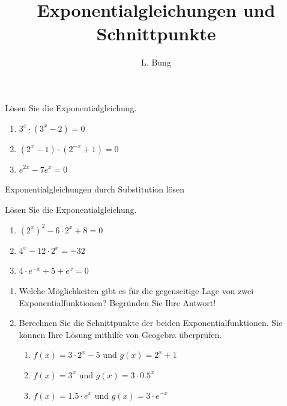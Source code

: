 \documentclass[11pt, a4paper, oneside]{article}
\begin{document}
	\author{L. Bung}
	\title{Exponentialgleichungen und Schnittpunkte}
	\subject{Mathematik}
	\maketitle
	
	
	Lösen Sie die Exponentialgleichung.
	
	\begin{enumerate}[label=\alph*)]
		\item $3^x \cdot \left(3^x - 2\right) = 0$
		\item $\left(2^x - 1\right) \cdot \left(2^{-x} + 1\right) = 0$
		\item $e^{2x} - 7e^x = 0$
	\end{enumerate}
	
	\checkered[16cm]
	
	\begin{hint}{Exponentialgleichungen durch Substitution lösen}
		\phantom{x}\vspace{5cm}
	\end{hint}
	
	
	Lösen Sie die Exponentialgleichung.
	
	\begin{enumerate}[label=\alph*)]
		\item $\left(2^x\right)^2 - 6 \cdot 2^x + 8 = 0$
		\item $4^x - 12 \cdot 2^x = -32$
		\item $4 \cdot e^{-x} + 5 + e^x = 0$
	\end{enumerate}
	
	\checkered[11cm]
	
	
	\begin{enumerate}[label=\alph*)]
		\item Welche Möglichkeiten gibt es für die gegenseitige Lage von zwei Exponentialfunktionen?
		Begründen Sie Ihre Antwort!
		
		\lines[2cm]
		
		\item Berechnen Sie die Schnittpunkte der beiden Exponentialfunktionen.
		Sie können Ihre Lösung mithilfe von Geogebra überprüfen.
		\begin{enumerate}[label=(\roman*)]
			\item $f(x) = 3 \cdot 2^x - 5$ und $g(x) = 2^x + 1$
			\item $f(x) = 3^x$ und $g(x) = 3 \cdot 0.5^x$
			\item $f(x) = 1.5 \cdot e^x$ und $g(x) = 3 \cdot e^{-x}$
		\end{enumerate}
	\end{enumerate}
	
	\checkered[14.5cm]
	
	\let\clearpage\relax
\end{document}
